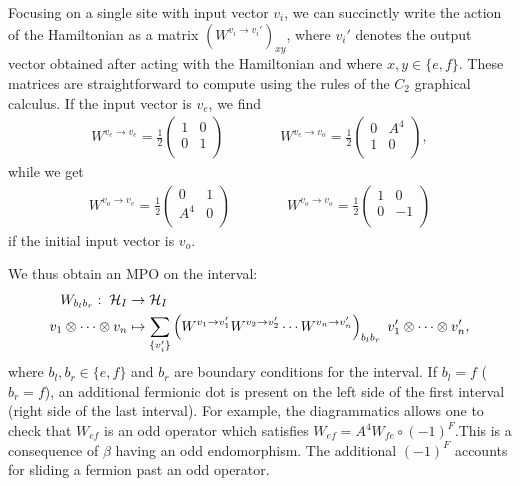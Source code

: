 Focusing on a single site with input vector $v_i$, 
we can succinctly write the action of the Hamiltonian as a matrix $(W^{v_i \to v_i'})_{xy}$, where $v_i'$ denotes the output vector obtained after acting with the Hamiltonian and where $x,y \in \{ e, f \}$.
These matrices are straightforward to compute using the rules of the $C_2$ graphical calculus.
If the input vector is $v_e$, we find
\begin{align}
W^{v_e \to v_e} = 
\frac{1}{2}\left( \begin{matrix} 
1 & 0\\
0 & 1 \\
\end{matrix} \right) \quad \quad \quad \quad 
W^{v_e \to v_o} = 
\frac{1}{2}\left( \begin{matrix} 
0& A^4\\
1 & 0 \\
\end{matrix} \right),
\end{align}
while we get
\begin{align}
W^{v_o \to v_e} = 
\frac{1}{2}\left( \begin{matrix} 
0 & 1\\
A^4 & 0\\
\end{matrix} \right) \quad \quad \quad \quad 
W^{v_o \to v_o} = 
\frac{1}{2}\left( \begin{matrix} 
1& 0\\
0 & -1 \\
\end{matrix} \right)
\end{align}
if the initial input vector is $v_o$.

We thus obtain an MPO on the interval:
\begin{align}
W_{b_l b_r}: \; \mathcal{H}_I &\to \mathcal{H}_I\\
v_1 \otimes \cdots \otimes v_n& \mapsto  \sum_{\{v_i' \}} \left( W^{v_1 \rightarrow v_1'} W^{v_2 \rightarrow v_2'} \cdots W^{v_n \rightarrow v_n'} \right)_{b_l b_r} \; v_1' \otimes \cdots \otimes v_n' ,
\end{align}
where $b_l,b_r \in \{e,f\}$ and $b_r$ are boundary conditions for the interval.
If $b_l=f$ ($b_r=f$), an additional fermionic dot is present on the left side of the first interval (right side of the last interval). 
For example, the diagrammatics allows one to check that $W_{ef}$ is an odd operator which satisfies $W_{ef} = A^4 W_{fe} \circ (-1)^F$.This is a consequence of $\beta$ having an odd endomorphism.
The additional $(-1)^F$ accounts for sliding a fermion past an odd operator.

